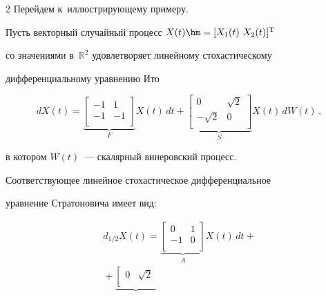 \begin{multicols}{2}
Перейдем к~иллюстрирующему примеру. 

Пусть векторный случайный процесс $X(t) \hm= [  X_1(t) ~ X_2(t)  ]^\trans$ 

со значениями в~$\mathds{R}^2$ удовлетворяет линейному стохастическому 

дифференциальному уравнению Ито



\noindent

$$

  dX(t) = \underbrace{\left[ \begin{array}{cc}

    -1 & 1 \\

    -1 & -1 \\

  \end{array} \right]}_F X(t) \, dt 

  +

  \underbrace{\left[ \begin{array}{cc}

    0 & \sqrt 2 \\

    -\sqrt 2 & 0 \\

  \end{array} \right]}_S X(t) \, dW(t)\,,

$$

в котором $W(t)$~--- скалярный винеровский процесс. 

Соответствующее линейное стохастическое дифференциальное 

уравнение Стратоновича имеет вид:

\begin{multline*}

  d_{1/2} X(t) = \underbrace{\left[ \begin{array}{cc}

    0 & 1 \\

    -1 & 0 \\

  \end{array} \right]}_A X(t) \, dt +{}\\

  {}+

  \underbrace{\left[ \begin{array}{cc}

    0 & \sqrt 2 \\


\end{array}}
\end{multline*}
\end{multicols}
